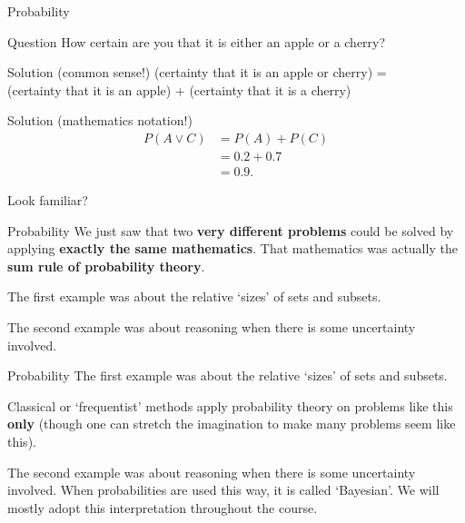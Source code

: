 \documentclass{beamer}
\begin{document}
\begin{frame}{Probability}%
\begin{block}{Question}
How certain are you that it is either an apple or a cherry?
\end{block}\pause

\begin{exampleblock}{Solution (common sense!)}
(certainty that it is an apple or cherry) = \\
\quad(certainty that it is an apple) + 
     (certainty that it is a cherry)
\end{exampleblock}\pause

\begin{exampleblock}{Solution (mathematics notation!)}
\vspace{-1em}
\begin{align}
P(A \vee C) &= P(A) + P(C) \\
            &= 0.2 + 0.7   \\
            &= 0.9. 
\end{align}
\end{exampleblock}\pause

Look familiar?
\end{frame}


\begin{frame}{Probability}%
We just saw that two {\bf very different problems} could be solved by
applying {\bf exactly the same mathematics}. That mathematics was
actually the {\bf sum rule of probability theory}.\pause

The first example was about the relative `sizes' of sets and
subsets.\pause

The second example was about reasoning when there is some
uncertainty involved.

\end{frame}%



\begin{frame}{Probability}%
The first example was about the relative `sizes' of sets and
subsets. \pause 

Classical or `frequentist' methods apply probability theory
on problems like this {\bf only} (though one can stretch the
imagination to make many problems seem like this).\pause

The second example was about reasoning when there is some
uncertainty involved. When probabilities are used this way,
it is called `Bayesian'. We will mostly adopt this interpretation
throughout the course.

\end{frame}%
\end{document}
